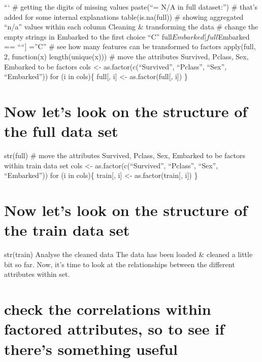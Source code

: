 \documentclass[
]{article}
\newenvironment{Shaded}{\begin{snugshade}}{\end{snugshade}}
\newcommand{\CommentTok}[1]{\textcolor[rgb]{0.56,0.35,0.01}{\textit{#1}}}
\begin{document}
\begin{Shaded}
\end{Shaded}

``` \# getting the digits of missing values paste(``= N/A in full
dataset:'') \# that's added for some internal explanations
table(is.na(full)) \# showing aggregated ``n/a'' values within each
column Cleaning \& transforming the data \# change the empty strings in
Embarked to the first choice ``C'' full\(Embarked[full\)Embarked ==
````{]} =''C'' \# see how many features can be transformed to factors
apply(full, 2, function(x) length(unique(x))) \# move the attributes
Survived, Pclass, Sex, Embarked to be factors cols \textless-
as.factor(c(``Survived'', ``Pclass'', ``Sex'', ``Embarked'')) for (i in
cols)\{ full{[}, i{]} \textless- as.factor(full{[}, i{]}) \}

\hypertarget{now-lets-look-on-the-structure-of-the-full-data-set}{%
\section{Now let's look on the structure of the full data
set}\label{now-lets-look-on-the-structure-of-the-full-data-set}}

str(full) \# move the attributes Survived, Pclass, Sex, Embarked to be
factors within train data set cols \textless- as.factor(c(``Survived'',
``Pclass'', ``Sex'', ``Embarked'')) for (i in cols)\{ train{[}, i{]}
\textless- as.factor(train{[}, i{]}) \}

\hypertarget{now-lets-look-on-the-structure-of-the-train-data-set}{%
\section{Now let's look on the structure of the train data
set}\label{now-lets-look-on-the-structure-of-the-train-data-set}}

str(train) Analyse the cleaned data The data has been loaded \& cleaned
a little bit so far. Now, it's time to look at the relationships between
the different attributes within set.

\hypertarget{check-the-correlations-within-factored-attributes-so-to-see-if-theres-something-useful}{%
\section{check the correlations within factored attributes, so to see if
there's something
useful}\label{check-the-correlations-within-factored-attributes-so-to-see-if-theres-something-useful}}
\end{document}

